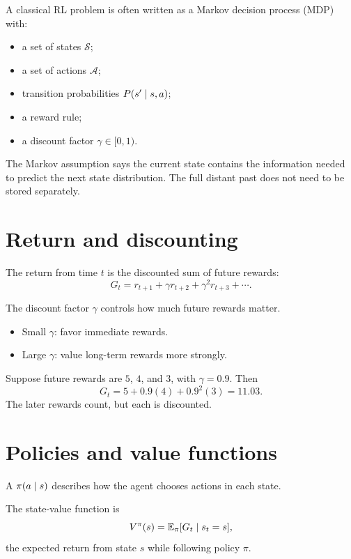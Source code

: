 A classical RL problem is often written as a Markov decision process (MDP) with:

\begin{itemize}
  \item a set of states $\mathcal{S}$;
  \item a set of actions $\mathcal{A}$;
  \item transition probabilities $P(s'\mathrel{|} s,a)$;
  \item a reward rule;
  \item a discount factor $\gamma\in[0,1)$.
\end{itemize}

The Markov assumption says the current state contains the information needed to predict the next state distribution. The full distant past does not need to be stored separately.

\section{Return and discounting}

The return from time $t$ is the discounted sum of future rewards:
\[
  G_t=r_{t+1}+\gamma r_{t+2}+\gamma^2r_{t+3}+\cdots.
\]

The discount factor $\gamma$ controls how much future rewards matter.

\begin{itemize}
  \item Small $\gamma$: favor immediate rewards.
  \item Large $\gamma$: value long-term rewards more strongly.
\end{itemize}

\begin{workedexample}
Suppose future rewards are $5$, $4$, and $3$, with $\gamma=0.9$. Then
\[
G_t=5+0.9(4)+0.9^2(3)=11.03.
\]
The later rewards count, but each is discounted.
\end{workedexample}

\section{Policies and value functions}

A  $\pi(a\mathrel{|} s)$ describes how the agent chooses actions in each state.

The state-value function is
\[
  V^{\pi}(s)=\mathbb{E}_{\pi}[G_t\mathrel{|} s_t=s],
\]
the expected return from state $s$ while following policy $\pi$.

